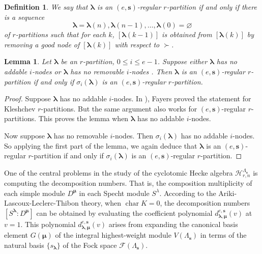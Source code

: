 \documentclass[a4paper,10pt]{amsart}
\theoremstyle{plain}
\renewcommand{\H}{\mathcal{H}}
\newcommand{\bvarnothing}{{\boldsymbol \varnothing}}
\def\bs{{\boldsymbol{s}}}
\def\blam{{\boldsymbol \lambda}}
\def\bmu{{\boldsymbol \mu}}
\theoremstyle{plain}
\newtheorem{lemma}[theorem]{Lemma}
\newtheorem{definition}[theorem]{Definition}
\numberwithin{equation}{section}
\begin{document}
\begin{definition}
We say that $\blam$ is an \emph{$(e,\bs)$-regular $r$-partition} if and only if there is a sequence
$$\blam= \blam(n), \blam(n-1), \ldots, \blam(0)= \bvarnothing$$
of $r$-partitions such that for each $k$, $[\blam(k-1)]$ is obtained from $[\blam(k)]$ by removing a good node of  $[\blam(k)]$ with respect to $\succ$.
\end{definition}


\begin{lemma}\label{Kleequ}
Let $\blam$ be an $r$-partition, $0\le i\le e-1$. Suppose either $\blam$ has no addable $i$-nodes or $\blam$ has no removable $i$-nodes  . Then $\blam$ is an $(e,\bs)$-regular $r$-partition if and only if $\sigma_i(\blam)$ is an $(e,\bs)$-regular $r$-partition.
\end{lemma}
\begin{proof} Suppose  $\blam$ has no addable $i$-nodes. In \cite[Lemma 1.9]{F2}), Fayers proved the statement for Kleshchev $r$-partitions. But the same argument also works for $(e,\bs)$-regular $r$-partitions. This proves the lemma when $\blam$ has no addable $i$-nodes.

Now suppose $\blam$ has no removable $i$-nodes. Then $\sigma_i(\blam)$ has no addable $i$-nodes. So applying the first part of the lemma, we again deduce that $\blam$ is an $(e,\bs)$-regular $r$-partition if and only if $\sigma_i(\blam)$ is an $(e,\bs)$-regular $r$-partition.
\end{proof}


One of the central problems in the study of the cyclotomic Hecke algebra $\H_{r,n}^{\Lambda_{\bs}}$ is computing the decomposition numbers. That is, the composition multiplicity of each simple module $D^\bmu$ in each Specht module $S^\lambda$. According to the Ariki-Lascoux-Leclerc-Thibon theory, when \(\operatorname{char}K=0\), the decomposition numbers \([S^\blam:D^\bmu]\) can be obtained by evaluating the coefficient polynomial \(d^{e,\bs}_{\blam,\bmu}(v)\) at \(v=1\). This polynomial $d^{e,\bs}_{\blam,\bmu}(v)$ arises from expanding the canonical basis element \(G(\bmu)\) of the integral highest-weight module \(V(\Lambda_\bs)\) in terms of the natural basis \(\{s_{\blam}\}\) of the Fock space $\mathcal{F}(\Lambda_\bs)$.
\end{document}
